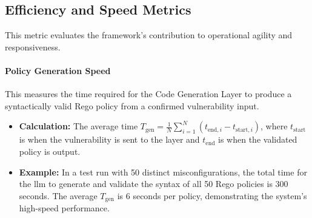 \subsection*{Efficiency and Speed Metrics}
This metric evaluates the framework's contribution to operational agility and responsiveness.

\paragraph{Policy Generation Speed} This measures the time required for the Code Generation Layer to produce a syntactically valid Rego policy from a confirmed vulnerability input.
\begin{itemize}
    \item \textbf{Calculation:} The average time \( T_{\text{gen}} = \frac{1}{N} \sum_{i=1}^{N} (t_{\text{end},i} - t_{\text{start},i}) \), where \( t_{\text{start}} \) is when the vulnerability is sent to the layer and \( t_{\text{end}} \) is when the validated policy is output.
    \item \textbf{Example:} In a test run with 50 distinct misconfigurations, the total time for the \gls{llm} to generate and validate the syntax of all 50 Rego policies is 300 seconds. The average \( T_{\text{gen}} \) is 6 seconds per policy, demonstrating the system's high-speed performance.
\end{itemize}


